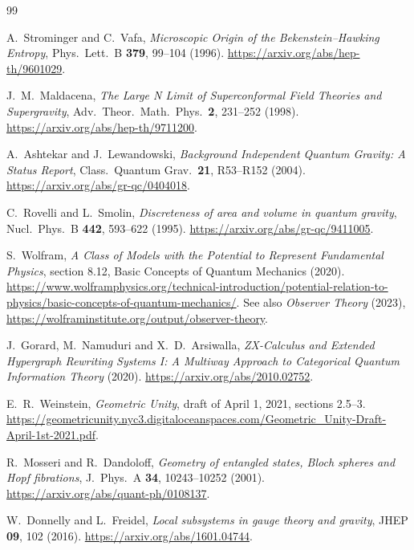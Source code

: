\begin{thebibliography}{99}
\providecommand{\OPHAdditionalReferences}{}
\OPHAdditionalReferences




\ifdefined\OPHEinsteinDerivationPaper
\else\ifdefined\OPHStandardModelDerivationPaper
\else
{}
A.~Strominger and C.~Vafa,
\emph{Microscopic Origin of the Bekenstein--Hawking Entropy},
Phys.\ Lett.\ B \textbf{379}, 99--104 (1996).
\url{https://arxiv.org/abs/hep-th/9601029}.

J.~M.~Maldacena,
\emph{The Large N Limit of Superconformal Field Theories and Supergravity},
Adv.\ Theor.\ Math.\ Phys.\ \textbf{2}, 231--252 (1998).
\url{https://arxiv.org/abs/hep-th/9711200}.

A.~Ashtekar and J.~Lewandowski,
\emph{Background Independent Quantum Gravity: A Status Report},
Class.\ Quantum Grav.\ \textbf{21}, R53--R152 (2004).
\url{https://arxiv.org/abs/gr-qc/0404018}.

C.~Rovelli and L.~Smolin,
\emph{Discreteness of area and volume in quantum gravity},
Nucl.\ Phys.\ B \textbf{442}, 593--622 (1995).
\url{https://arxiv.org/abs/gr-qc/9411005}.

S.~Wolfram,
\emph{A Class of Models with the Potential to Represent Fundamental Physics},
section 8.12, Basic Concepts of Quantum Mechanics (2020).
\url{https://www.wolframphysics.org/technical-introduction/potential-relation-to-physics/basic-concepts-of-quantum-mechanics/}.
See also \emph{Observer Theory} (2023),
\url{https://wolframinstitute.org/output/observer-theory}.

J.~Gorard, M.~Namuduri and X.~D.~Arsiwalla,
\emph{ZX-Calculus and Extended Hypergraph Rewriting Systems I:
A Multiway Approach to Categorical Quantum Information Theory} (2020).
\url{https://arxiv.org/abs/2010.02752}.

E.~R.~Weinstein,
\emph{Geometric Unity}, draft of April 1, 2021, sections 2.5--3.
\url{https://geometricunity.nyc3.digitaloceanspaces.com/Geometric_Unity-Draft-April-1st-2021.pdf}.

R.~Mosseri and R.~Dandoloff,
\emph{Geometry of entangled states, Bloch spheres and Hopf fibrations},
J.\ Phys.\ A \textbf{34}, 10243--10252 (2001).
\url{https://arxiv.org/abs/quant-ph/0108137}.

W.~Donnelly and L.~Freidel,
\emph{Local subsystems in gauge theory and gravity},
JHEP \textbf{09}, 102 (2016).
\url{https://arxiv.org/abs/1601.04744}.
\fi\fi

\ifdefined\OPHPriorWorkBibitems\InputIfFileExists{\OPHPriorWorkBibitems}{}{}\fi
\end{thebibliography}
